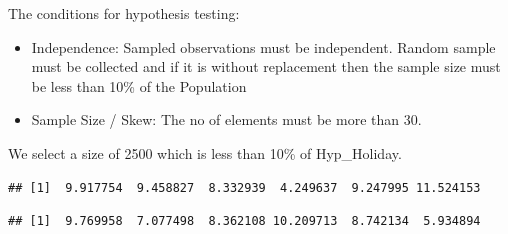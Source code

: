 \documentclass[]{article}
\newenvironment{Shaded}{\begin{snugshade}}{\end{snugshade}}
\newcommand{\KeywordTok}[1]{\textcolor[rgb]{0.13,0.29,0.53}{\textbf{{#1}}}}
\newcommand{\DecValTok}[1]{\textcolor[rgb]{0.00,0.00,0.81}{{#1}}}
\newcommand{\StringTok}[1]{\textcolor[rgb]{0.31,0.60,0.02}{{#1}}}
\newcommand{\NormalTok}[1]{{#1}}
\begin{document}
The conditions for hypothesis testing:

\begin{itemize}
\itemsep1pt\parskip0pt
\item
  Independence: Sampled observations must be independent. Random sample
  must be collected and if it is without replacement then the sample
  size must be less than 10\% of the Population
\item
  Sample Size / Skew: The no of elements must be more than 30.
\end{itemize}

We select a size of 2500 which is less than 10\% of Hyp\_Holiday.

\begin{Shaded}
\end{Shaded}

\begin{verbatim}
## [1]  9.917754  9.458827  8.332939  4.249637  9.247995 11.524153
\end{verbatim}

\begin{Shaded}
\end{Shaded}

\begin{verbatim}
## [1]  9.769958  7.077498  8.362108 10.209713  8.742134  5.934894
\end{verbatim}
\end{document}
